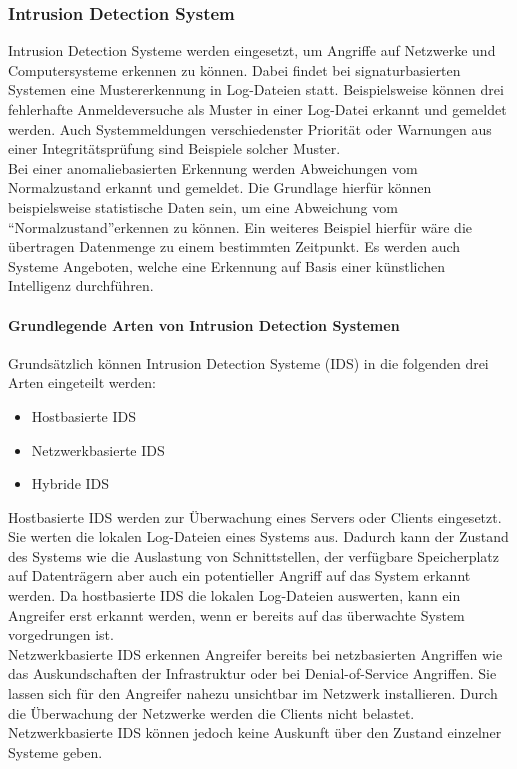 \newpage
\subsubsection{Intrusion Detection System}

Intrusion Detection Systeme werden eingesetzt, um Angriffe auf Netzwerke und Computersysteme erkennen zu können. Dabei findet bei signaturbasierten Systemen eine Mustererkennung in Log-Dateien statt. Beispielsweise können drei fehlerhafte Anmeldeversuche als Muster in einer Log-Datei erkannt und gemeldet werden. Auch Systemmeldungen verschiedenster Priorität oder Warnungen aus einer Integritätsprüfung sind Beispiele solcher Muster.\\
Bei einer anomaliebasierten Erkennung werden Abweichungen vom Normalzustand erkannt und gemeldet. Die Grundlage hierfür können beispielsweise statistische Daten sein, um eine Abweichung vom "`Normalzustand"'erkennen zu können. Ein weiteres Beispiel hierfür wäre die übertragen Datenmenge zu einem bestimmten Zeitpunkt. Es werden auch Systeme Angeboten, welche eine Erkennung auf Basis einer künstlichen Intelligenz durchführen.   

\paragraph{Grundlegende Arten von Intrusion Detection Systemen}
Grundsätzlich können Intrusion Detection Systeme (IDS) in die folgenden drei Arten eingeteilt werden:

\begin{itemize}
\item Hostbasierte IDS
\item Netzwerkbasierte IDS
\item Hybride IDS
\end{itemize}

\noindent Hostbasierte IDS werden zur Überwachung eines Servers oder Clients eingesetzt. Sie werten die lokalen Log-Dateien eines Systems aus. Dadurch kann der Zustand des Systems wie die Auslastung von Schnittstellen, der verfügbare Speicherplatz auf Datenträgern aber auch ein potentieller Angriff auf das System erkannt werden. Da hostbasierte IDS die lokalen Log-Dateien auswerten, kann ein Angreifer erst erkannt werden, wenn er bereits auf das überwachte System vorgedrungen ist.\\ 

\noindent Netzwerkbasierte IDS erkennen Angreifer bereits bei netzbasierten Angriffen wie das Auskundschaften der Infrastruktur oder bei Denial-of-Service Angriffen. Sie lassen sich für den Angreifer nahezu unsichtbar im Netzwerk installieren. Durch die Überwachung der Netzwerke werden die Clients nicht belastet. Netzwerkbasierte IDS können jedoch keine Auskunft über den Zustand einzelner Systeme geben.\\ 

